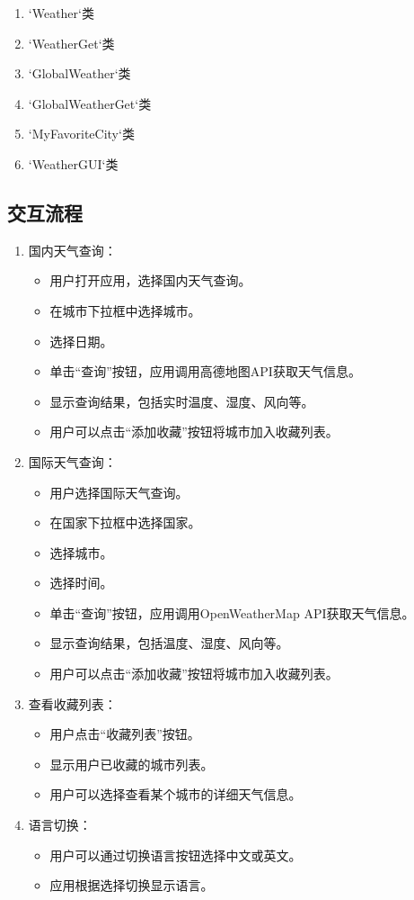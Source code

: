 \documentclass[UTF8]{ctexart}
\begin{document}
\begin{enumerate}
   \item `Weather`类
   \item `WeatherGet`类
   \item `GlobalWeather`类
   \item `GlobalWeatherGet`类
   \item `MyFavoriteCity`类
   \item `WeatherGUI`类
\end{enumerate}

\subsection{交互流程}
\begin{enumerate}
   \item 国内天气查询：
         \begin{itemize}
            \item 用户打开应用，选择国内天气查询。
            \item 在城市下拉框中选择城市。
            \item 选择日期。
            \item 单击“查询”按钮，应用调用高德地图API获取天气信息。
            \item 显示查询结果，包括实时温度、湿度、风向等。
            \item 用户可以点击“添加收藏”按钮将城市加入收藏列表。
         \end{itemize}
   \item 国际天气查询：
         \begin{itemize}
            \item 用户选择国际天气查询。
            \item 在国家下拉框中选择国家。
            \item 选择城市。
            \item 选择时间。
            \item 单击“查询”按钮，应用调用OpenWeatherMap API获取天气信息。
            \item 显示查询结果，包括温度、湿度、风向等。
            \item 用户可以点击“添加收藏”按钮将城市加入收藏列表。
         \end{itemize}
   \item 查看收藏列表：
         \begin{itemize}
            \item 用户点击“收藏列表”按钮。
            \item 显示用户已收藏的城市列表。
            \item 用户可以选择查看某个城市的详细天气信息。
         \end{itemize}
   \item 语言切换：
         \begin{itemize}
            \item 用户可以通过切换语言按钮选择中文或英文。
            \item 应用根据选择切换显示语言。
         \end{itemize}
\end{enumerate}
\end{document}
